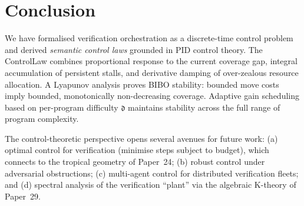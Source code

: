 \documentclass[11pt]{article}
\newcommand{\difficulty}{\mathfrak{d}}     %
\begin{document}
\section{Conclusion}
\label{sec:conclusion}

We have formalised verification orchestration as a discrete-time
control problem and derived \emph{semantic control laws} grounded in
PID control theory.  The ControlLaw combines proportional response to
the current coverage gap, integral accumulation of persistent stalls,
and derivative damping of over-zealous resource allocation.  A
Lyapunov analysis proves BIBO stability: bounded move costs imply
bounded, monotonically non-decreasing coverage.  Adaptive gain
scheduling based on per-program difficulty $\difficulty$ maintains
stability across the full range of program complexity.

The control-theoretic perspective opens several avenues for future
work: (a) optimal control for verification (minimise steps subject to
budget), which connects to the tropical geometry of Paper~24;
(b) robust control under adversarial obstructions;
(c) multi-agent control for distributed verification fleets;
and (d) spectral analysis of the verification ``plant'' via the
algebraic K-theory of Paper~29.
\end{document}
